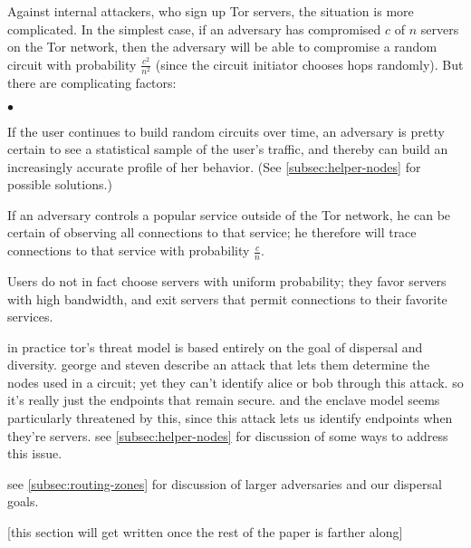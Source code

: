 \documentclass{llncs}
\newenvironment{tightlist}{\begin{list}{$\bullet$}{
  \setlength{\itemsep}{0mm}
    \setlength{\parsep}{0mm}
    }}{\end{list}}
\begin{document}
Against internal attackers, who sign up Tor servers, the situation is more
complicated.  In the simplest case, if an adversary has compromised $c$ of
$n$ servers on the Tor network, then the adversary will be able to compromise
a random circuit with probability $\frac{c^2}{n^2}$ (since the circuit
initiator chooses hops randomly).  But there are
complicating factors:
\begin{tightlist}
\item If the user continues to build random circuits over time, an adversary
  is pretty certain to see a statistical sample of the user's traffic, and
  thereby can build an increasingly accurate profile of her behavior.  (See
  \ref{subsec:helper-nodes} for possible solutions.)
\item If an adversary controls a popular service outside of the Tor network,
  he can be certain of observing all connections to that service; he
  therefore will trace connections to that service with probability
  $\frac{c}{n}$.
\item Users do not in fact choose servers with uniform probability; they
  favor servers with high bandwidth, and exit servers that permit connections
  to their favorite services.
\end{tightlist}

%

in practice tor's threat model is based entirely on the goal of dispersal
and diversity. george and steven describe an attack \cite{draft} that
lets them determine the nodes used in a circuit; yet they can't identify
alice or bob through this attack. so it's really just the endpoints that
remain secure. and the enclave model seems particularly threatened by
this, since this attack lets us identify endpoints when they're servers.
see \ref{subsec:helper-nodes} for discussion of some ways to address this
issue.

see \ref{subsec:routing-zones} for discussion of larger
adversaries and our dispersal goals.

[this section will get written once the rest of the paper is farther along]
\end{document}
